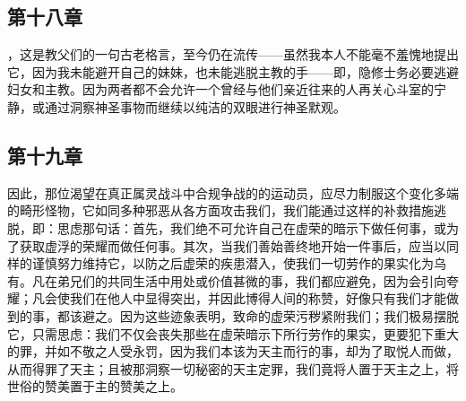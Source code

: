 
\subsection{第十八章}

\par

，这是教父们的一句古老格言，至今仍在流传——虽然我本人不能毫不羞愧地提出它，因为我未能避开自己的妹妹，也未能逃脱主教的手——即，隐修士务必要逃避妇女和主教。因为两者都不会允许一个曾经与他们亲近往来的人再关心斗室的宁静，或通过洞察神圣事物而继续以纯洁的双眼进行神圣默观。\par


\subsection{第十九章}

\par

因此，那位渴望在真正属灵战斗中合规争战的的运动员，应尽力制服这个变化多端的畸形怪物，它如同多种邪恶从各方面攻击我们，我们能通过这样的补救措施逃脱，即：思虑那句话：首先，我们绝不可允许自己在虚荣的暗示下做任何事，或为了获取虚浮的荣耀而做任何事。其次，当我们善始善终地开始一件事后，应当以同样的谨慎努力维持它，以防之后虚荣的疾患潜入，使我们一切劳作的果实化为乌有。凡在弟兄们的共同生活中用处或价值甚微的事，我们都应避免，因为会引向夸耀；凡会使我们在他人中显得突出，并因此博得人间的称赞，好像只有我们才能做到的事，都该避之。因为这些迹象表明，致命的虚荣污秽紧附我们；我们极易摆脱它，只需思虑：我们不仅会丧失那些在虚荣暗示下所行劳作的果实，更要犯下重大的罪，并如不敬之人受永罚，因为我们本该为天主而行的事，却为了取悦人而做，从而得罪了天主；且被那洞察一切秘密的天主定罪，我们竟将人置于天主之上，将世俗的赞美置于主的赞美之上。\par



